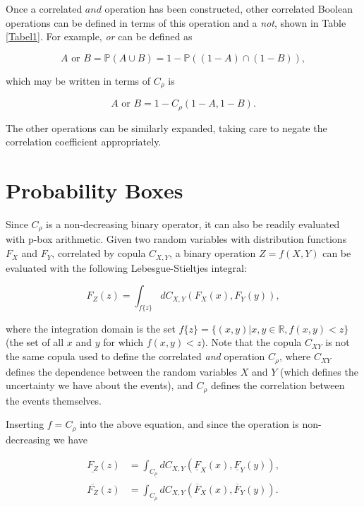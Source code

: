 \documentclass[runningheads]{llncs}
\begin{document}
Once a correlated $and$ operation has been constructed, other correlated Boolean operations can be defined in terms of this operation and a \textit{not}, shown in Table \ref{Tabel1}. For example, \textit{or} can be defined as

\begin{equation*}
    A \text{ or } B = \mathbb{P}(A \cup B) = 1 - \mathbb{P}((1 -A) \cap (1-B)),
\end{equation*}

\noindent which may be written in terms of $C_{\rho}$ is

\begin{equation}
    A \text{ or } B = 1 - C_{\rho}(1-A,1-B).
\end{equation}

\noindent The other operations can be similarly expanded, taking care to negate the correlation coefficient appropriately.

\section{Probability Boxes}

Since $C_{\rho}$ is a non-decreasing binary operator, it can also be readily evaluated with p-box arithmetic. Given two random variables with distribution functions $F_{X}$ and $F_{Y}$, correlated by copula $C_{X,Y}$, a binary operation $Z= f(X,Y)$ can be evaluated with the following Lebesgue-Stieltjes integral: 

\begin{equation*}
  F_{Z}(z) = \int_{f\{z\}}dC_{X,Y}(F_{X}(x),F_{Y}(y)) ,
\end{equation*}

\noindent where the integration domain is the set $f\{z\} = \{(x,y)| x,y \in \mathbb{R}, f(x,y) < z\}$ (the set of all $x$ and $y$ for which $f(x,y) < z$). Note that the copula $C_{XY}$ is not the same copula used to define the correlated \textit{and} operation $C_{\rho}$, where $C_{XY}$ defines the dependence between the random variables $X$ and $Y$ (which defines the uncertainty we have about the events), and $C_{\rho}$ defines the correlation between the events themselves.

\noindent Inserting $f = C_{\rho}$ into the above equation, and since the operation is non-decreasing we have


\begin{align}
    \underline{F_{Z}}(z) &= \int_{C_{\underline{\rho}}}dC_{X,Y}(\underline{F}_{X}(x), \underline{F}_{Y}(y))
    , \label{eq:pbox_and1} \\
    \overline{F_{Z}}(z) &= \int_{C_{\overline{\rho}}}dC_{X,Y}(\overline{F}_{X}(x), \overline{F}_{Y}(y)) .
    \label{eq:pbox_and2}
\end{align}
\end{document}
